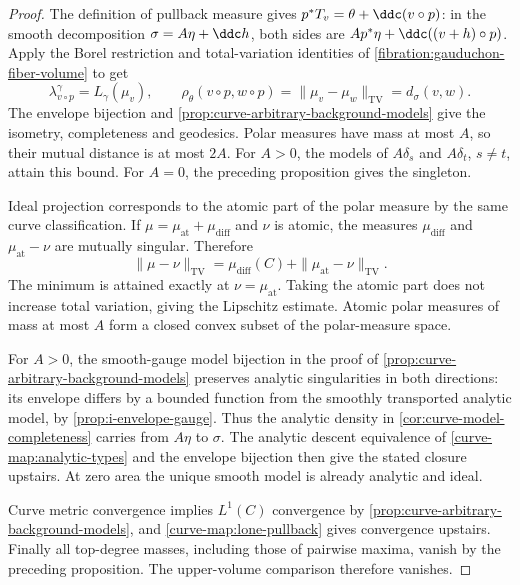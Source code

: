 \begin{proof}
The definition of pullback measure gives
$p^*T_v=\theta+\ddc(v\circ p)$: in the smooth decomposition
$\sigma=A\eta+\ddc h$, both sides are
$A p^*\eta+\ddc((v+h)\circ p)$. Apply the Borel restriction and
total-variation identities of
\cref{fibration:gauduchon-fiber-volume} to get
\[
 \lambda_{v\circ p}^\gamma=L_\gamma(\mu_v),\qquad
 \rho_\theta(v\circ p,w\circ p)
       =\|\mu_v-\mu_w\|_{\mathrm{TV}}=d_\sigma(v,w).
\]
The envelope bijection and
\cref{prop:curve-arbitrary-background-models} give the isometry,
completeness and geodesics. Polar measures have mass at most
$A$, so their mutual distance is at most $2A$. For $A>0$, the
models of $A\delta_s$ and $A\delta_t$, $s\ne t$, attain this
bound. For $A=0$, the preceding proposition gives the singleton.

Ideal projection corresponds to the atomic part of the polar
measure by the same curve classification. If
$\mu=\mu_{\mathrm{at}}+\mu_{\mathrm{diff}}$ and $\nu$ is atomic,
the measures $\mu_{\mathrm{diff}}$ and
$\mu_{\mathrm{at}}-\nu$ are mutually singular. Therefore
\[
 \|\mu-\nu\|_{\mathrm{TV}}
  =\mu_{\mathrm{diff}}(C)
     +\|\mu_{\mathrm{at}}-\nu\|_{\mathrm{TV}}.
\]
The minimum is attained exactly at $\nu=\mu_{\mathrm{at}}$.
Taking the atomic part does not increase total variation, giving
the Lipschitz estimate. Atomic polar measures of mass at most
$A$ form a closed convex subset of the polar-measure space.

For $A>0$, the smooth-gauge model bijection in the proof of
\cref{prop:curve-arbitrary-background-models} preserves analytic
singularities in both directions: its envelope differs by a
bounded function from the smoothly transported analytic model,
by \cref{prop:i-envelope-gauge}. Thus the analytic density in
\cref{cor:curve-model-completeness} carries from $A\eta$ to
$\sigma$. The analytic descent equivalence of
\cref{curve-map:analytic-types} and the envelope bijection then
give the stated closure upstairs. At zero area the unique smooth
model is already analytic and ideal.

Curve metric convergence implies $L^1(C)$ convergence by
\cref{prop:curve-arbitrary-background-models}, and
\cref{curve-map:lone-pullback} gives convergence upstairs.
Finally all top-degree masses, including those of pairwise
maxima, vanish by the preceding proposition. The upper-volume
comparison therefore vanishes.
\end{proof}

